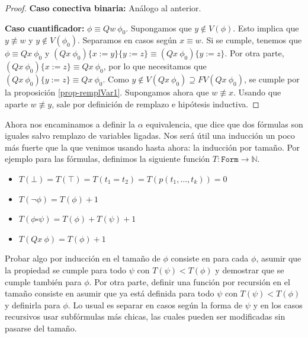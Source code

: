 \documentclass[a4paper, 12pt]{report}
\newcommand{\N}{\mathbb{N}}
\theoremstyle{definition}
\begin{document}
\begin{proof}
	\textbf{Caso conectiva binaria:} Análogo al anterior.
	
	\textbf{Caso cuantificador:} $\phi\equiv Qw~\phi_0$. Supongamos que $y\not\in V(\phi)$. Esto implica que $y\not\equiv w$ y $y\not\in V(\phi_0)$. Separamos en casos según $x\equiv w$. Si se cumple, tenemos que $\phi\equiv Qx~\phi_0$ y $(Qx~\phi_0)\{x:=y\}\{y:=z\}\equiv(Qx~\phi_0)\{y:=z\}$. Por otra parte, $(Qx~\phi_0)\{x:=z\}\equiv Qx~\phi_0$, por lo que necesitamos que $(Qx~\phi_0)\{y:=z\}\equiv Qx~\phi_0$. Como $y\not\in V(Qx~\phi_0)\supseteq FV(Qx~\phi_0)$, se cumple por la proposición \ref{prop-remplVar1}. Supongamos ahora que $w\not\equiv x$. Usando que aparte $w\not\equiv y$, sale por definición de remplazo e hipótesis inductiva.
\end{proof}



Ahora nos encaminamos a definir la $\alpha$ equivalencia, que dice que dos fórmulas son iguales salvo remplazo de variables ligadas. Nos será útil una inducción un poco más fuerte que la que venimos usando hasta ahora: la inducción por tamaño. Por ejemplo para las fórmulas, definimos la siguiente función $T:\mathtt{Form}\to\N$.
\begin{itemize}
	\item $T(\bot)=T(\top)=T(t_1=t_2)=T(p(t_1,\dots,t_k))=0$
	\item $T(\lnot\phi) = T(\phi) + 1$
	\item $T(\phi\square\psi) = T(\phi) + T(\psi) + 1$
	\item $T(Qx~\phi) = T(\phi) + 1$
\end{itemize}
Probar algo por inducción en el tamaño de $\phi$ consiste en para cada $\phi$, asumir que la propiedad se cumple para todo $\psi$ con $T(\psi)<T(\phi)$ y demostrar que se cumple también para $\phi$. Por otra parte, definir una función por recursión en el tamaño consiste en asumir que ya está definida para todo $\psi$ con $T(\psi)<T(\phi)$ y definirla para $\phi$. Lo usual es separar en casos según la forma de $\psi$ y en los casos recursivos usar subfórmulas más chicas, las cuales pueden ser modificadas sin pasarse del tamaño.
\end{document}
